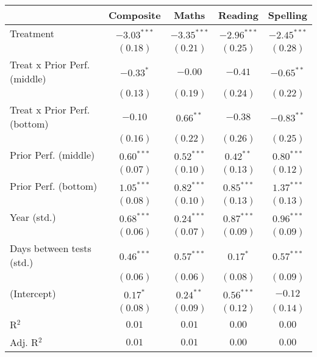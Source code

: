 
\begin{table}
\begin{center}
\begin{tabular}{l c c c c}
\hline
 & Composite & Maths & Reading & Spelling \\
\hline
Treatment                    & $-3.03^{***}$ & $-3.35^{***}$ & $-2.96^{***}$ & $-2.45^{***}$ \\
                             & $(0.18)$      & $(0.21)$      & $(0.25)$      & $(0.28)$      \\
Treat x Prior Perf. (middle) & $-0.33^{*}$   & $-0.00$       & $-0.41$       & $-0.65^{**}$  \\
                             & $(0.13)$      & $(0.19)$      & $(0.24)$      & $(0.22)$      \\
Treat x Prior Perf. (bottom) & $-0.10$       & $0.66^{**}$   & $-0.38$       & $-0.83^{**}$  \\
                             & $(0.16)$      & $(0.22)$      & $(0.26)$      & $(0.25)$      \\
Prior Perf. (middle)         & $0.60^{***}$  & $0.52^{***}$  & $0.42^{**}$   & $0.80^{***}$  \\
                             & $(0.07)$      & $(0.10)$      & $(0.13)$      & $(0.12)$      \\
Prior Perf. (bottom)         & $1.05^{***}$  & $0.82^{***}$  & $0.85^{***}$  & $1.37^{***}$  \\
                             & $(0.08)$      & $(0.10)$      & $(0.13)$      & $(0.13)$      \\
Year (std.)                  & $0.68^{***}$  & $0.24^{***}$  & $0.87^{***}$  & $0.96^{***}$  \\
                             & $(0.06)$      & $(0.07)$      & $(0.09)$      & $(0.09)$      \\
Days between tests (std.)    & $0.46^{***}$  & $0.57^{***}$  & $0.17^{*}$    & $0.57^{***}$  \\
                             & $(0.06)$      & $(0.06)$      & $(0.08)$      & $(0.09)$      \\
(Intercept)                  & $0.17^{*}$    & $0.24^{**}$   & $0.56^{***}$  & $-0.12$       \\
                             & $(0.08)$      & $(0.09)$      & $(0.12)$      & $(0.14)$      \\
\hline
R$^2$                        & $0.01$        & $0.01$        & $0.00$        & $0.00$        \\
Adj. R$^2$                   & $0.01$        & $0.01$        & $0.00$        & $0.00$        \\

\end{tabular}
\end{center}
\end{table}
